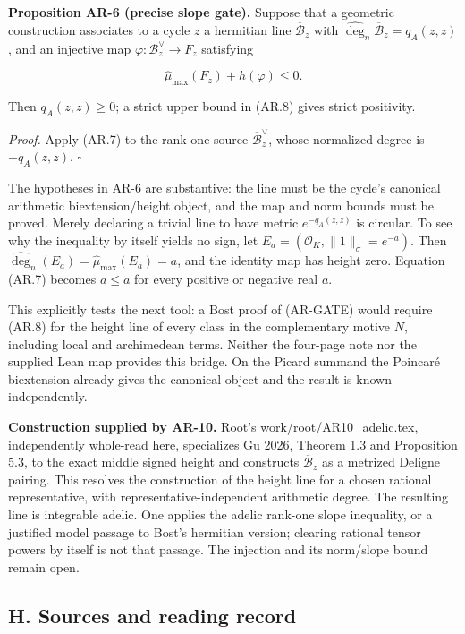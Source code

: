 \documentclass[11pt,a4paper]{article}
\begin{document}
\textbf{Proposition AR-6 (precise slope gate).} Suppose that a geometric
construction associates to a cycle \(z\) a hermitian line
\(\overline{\mathcal B}_z\) with
\(\widehat{\deg}_n\overline{\mathcal B}_z=q_A(z,z)\), and an injective
map \(\varphi:\mathcal B_z^\vee\to F_z\) satisfying

\[
\widehat\mu_{\max}(F_z)+h(\varphi)\le0.
\tag{AR.8}
\]

Then \(q_A(z,z)\ge0\); a strict upper bound in (AR.8) gives strict
positivity.

\emph{Proof.} Apply (AR.7) to the rank-one source
\(\overline{\mathcal B}_z^\vee\), whose normalized degree is
\(-q_A(z,z)\). \(\square\)

The hypotheses in AR-6 are substantive: the line must be the cycle's
canonical arithmetic biextension/height object, and the map and norm
bounds must be proved. Merely declaring a trivial line to have metric
\(e^{-q_A(z,z)}\) is circular. To see why the inequality by itself
yields no sign, let \(E_a=(\mathcal O_K,\|1\|_\sigma=e^{-a})\). Then
\(\widehat{\deg}_n(E_a)=\widehat\mu_{\max}(E_a)=a\), and the identity
map has height zero. Equation (AR.7) becomes \(a\le a\) for every
positive or negative real \(a\).

This explicitly tests the next tool: a Bost proof of (AR-GATE) would
require (AR.8) for the height line of every class in the complementary
motive \(N\), including local and archimedean terms. Neither the
four-page note nor the supplied Lean map provides this bridge. On the
Picard summand the Poincaré biextension already gives the canonical
object and the result is known independently.

\textbf{Construction supplied by AR-10.} Root's
work/root/AR10\_adelic.tex, independently whole-read here, specializes
Gu 2026, Theorem 1.3 and Proposition 5.3, to the exact middle signed
height and constructs \(\overline{\mathcal B}_z\) as a metrized Deligne
pairing. This resolves the construction of the height line for a chosen
rational representative, with representative-independent arithmetic
degree. The resulting line is integrable adelic. One applies the adelic
rank-one slope inequality, or a justified model passage to Bost's
hermitian version; clearing rational tensor powers by itself is not that
passage. The injection and its norm/slope bound remain open.

\subsection{H. Sources and reading
record}\label{h.-sources-and-reading-record}
\end{document}
